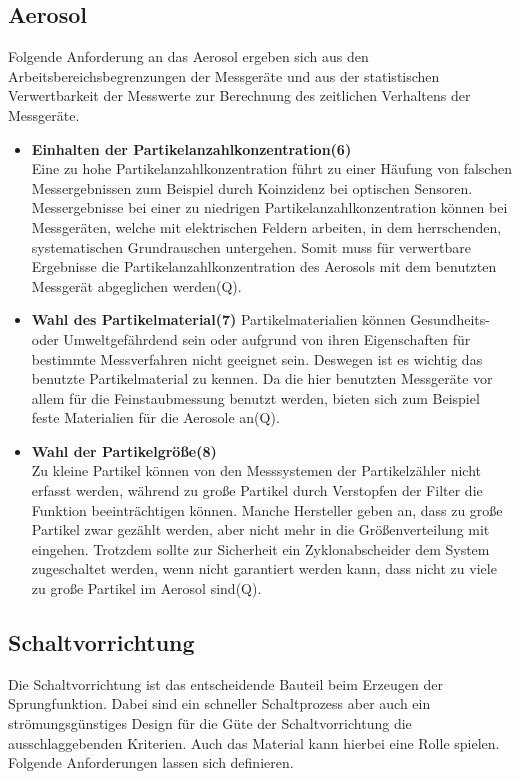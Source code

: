 \subsection{Aerosol}
Folgende Anforderung an das Aerosol ergeben sich aus den Arbeitsbereichsbegrenzungen der Messger\"{a}te und aus der statistischen Verwertbarkeit der Messwerte zur Berechnung des zeitlichen Verhaltens der Messger\"{a}te.

\begin{itemize}
\item \textbf{Einhalten der Partikelanzahlkonzentration(6)}\\
Eine zu hohe Partikelanzahlkonzentration f\"{u}hrt zu einer H\"{a}ufung von falschen Messergebnissen zum Beispiel durch Koinzidenz bei optischen Sensoren. Messergebnisse bei einer zu niedrigen Partikelanzahlkonzentration k\"{o}nnen bei Messger\"{a}ten, welche mit elektrischen Feldern arbeiten, in dem herrschenden, systematischen Grundrauschen untergehen. Somit muss f\"{u}r verwertbare Ergebnisse die Partikelanzahlkonzentration des Aerosols mit dem benutzten Messger\"{a}t abgeglichen werden(Q).

\item \textbf{Wahl des Partikelmaterial(7)} 
Partikelmaterialien k\"{o}nnen Gesundheits- oder Umweltgef\"{a}hrdend sein oder aufgrund von ihren Eigenschaften f\"{u}r bestimmte Messverfahren nicht geeignet sein. Deswegen ist es wichtig das benutzte Partikelmaterial zu kennen. Da die hier benutzten Messger\"{a}te vor allem f\"{u}r die Feinstaubmessung benutzt werden, bieten sich zum Beispiel feste Materialien f\"{u}r die Aerosole an(Q).

\item \textbf{Wahl der Partikelgr\"{o}{\ss}e(8)}\\ 
Zu kleine Partikel k\"{o}nnen von den Messsystemen der Partikelz\"{a}hler nicht erfasst werden, w\"{a}hrend zu gro{\ss}e Partikel durch Verstopfen der Filter die Funktion beeintr\"{a}chtigen k\"{o}nnen. Manche Hersteller geben an, dass zu gro{\ss}e Partikel zwar gez\"{a}hlt werden, aber nicht mehr in die Gr\"{o}{\ss}enverteilung mit eingehen. Trotzdem sollte zur Sicherheit ein Zyklonabscheider dem System zugeschaltet werden, wenn nicht garantiert werden kann, dass nicht zu viele zu gro{\ss}e Partikel im Aerosol sind(Q).
\end{itemize}

\subsection{Schaltvorrichtung}
Die Schaltvorrichtung ist das entscheidende Bauteil beim Erzeugen der Sprungfunktion. Dabei sind ein schneller Schaltprozess aber auch ein str\"{o}mungsg\"{u}nstiges Design f\"{u}r die G\"{u}te der Schaltvorrichtung die ausschlaggebenden Kriterien. Auch das Material kann hierbei eine Rolle spielen. Folgende Anforderungen lassen sich definieren.

